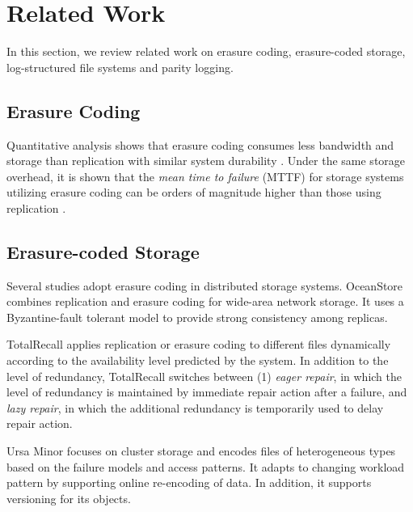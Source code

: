 \section{Related Work}
\label{chap:relatedwork}

In this section, we review related work on erasure coding, erasure-coded
storage, log-structured file systems and parity logging.

\subsection{Erasure Coding}

Quantitative analysis shows that erasure coding consumes less bandwidth and
storage than replication with similar system durability
\cite{weatherspoon02,rodrigues05}. Under the same storage overhead, it is shown
that the \textit{mean time to failure} (MTTF) for storage systems utilizing
erasure coding can be orders of magnitude higher than those using replication
\cite{weatherspoon02}.


\subsection{Erasure-coded Storage}


Several studies adopt erasure coding in distributed storage systems.  OceanStore
\cite{kubiatowicz00,rhea03} combines replication and erasure coding for
wide-area network storage.  It uses a Byzantine-fault tolerant model to provide
strong consistency among replicas.

TotalRecall \cite{bhagwan04} applies replication or erasure coding to different
files dynamically according to the availability level predicted by the system.
In addition to the level of redundancy, TotalRecall switches between (1)
\textit{eager repair}, in which the level of redundancy is maintained by
immediate repair action after a failure, and \textit{lazy repair}, in which the
additional redundancy is temporarily used to delay repair action.


Ursa Minor \cite{abd05} focuses on cluster storage and encodes files of
heterogeneous types based on the failure models and access patterns. It adapts
to changing workload pattern by supporting online re-encoding of data. In
addition, it supports versioning for its objects.

